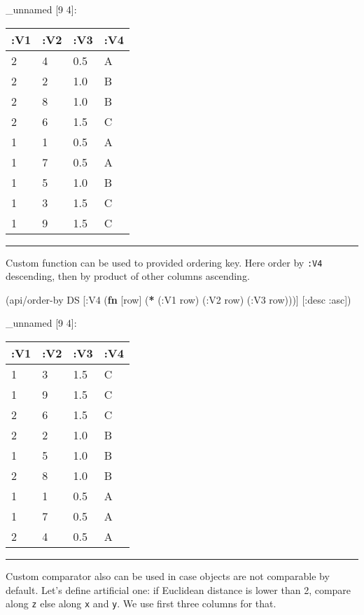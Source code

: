 \documentclass[]{article}
\newenvironment{Shaded}{\begin{snugshade}}{\end{snugshade}}
\newcommand{\AttributeTok}[1]{\textcolor[rgb]{0.77,0.63,0.00}{#1}}
\newcommand{\KeywordTok}[1]{\textcolor[rgb]{0.13,0.29,0.53}{\textbf{#1}}}
\newcommand{\NormalTok}[1]{#1}
\begin{document}
\_unnamed {[}9 4{]}:

\begin{longtable}[]{@{}llll@{}}
\toprule
:V1 & :V2 & :V3 & :V4\tabularnewline
\midrule
\endhead
2 & 4 & 0.5 & A\tabularnewline
2 & 2 & 1.0 & B\tabularnewline
2 & 8 & 1.0 & B\tabularnewline
2 & 6 & 1.5 & C\tabularnewline
1 & 1 & 0.5 & A\tabularnewline
1 & 7 & 0.5 & A\tabularnewline
1 & 5 & 1.0 & B\tabularnewline
1 & 3 & 1.5 & C\tabularnewline
1 & 9 & 1.5 & C\tabularnewline
\bottomrule
\end{longtable}

\begin{center}\rule{0.5\linewidth}{0.5pt}\end{center}

Custom function can be used to provided ordering key. Here order by
\texttt{:V4} descending, then by product of other columns ascending.

\begin{Shaded}
\begin{Highlighting}[]
\NormalTok{(api/order-by DS [}\AttributeTok{:V4}\NormalTok{ (}\KeywordTok{fn}\NormalTok{ [row] (}\KeywordTok{*}\NormalTok{ (}\AttributeTok{:V1}\NormalTok{ row)}
\NormalTok{                                  (}\AttributeTok{:V2}\NormalTok{ row)}
\NormalTok{                                  (}\AttributeTok{:V3}\NormalTok{ row)))] [}\AttributeTok{:desc} \AttributeTok{:asc}\NormalTok{])}
\end{Highlighting}
\end{Shaded}

\_unnamed {[}9 4{]}:

\begin{longtable}[]{@{}llll@{}}
\toprule
:V1 & :V2 & :V3 & :V4\tabularnewline
\midrule
\endhead
1 & 3 & 1.5 & C\tabularnewline
1 & 9 & 1.5 & C\tabularnewline
2 & 6 & 1.5 & C\tabularnewline
2 & 2 & 1.0 & B\tabularnewline
1 & 5 & 1.0 & B\tabularnewline
2 & 8 & 1.0 & B\tabularnewline
1 & 1 & 0.5 & A\tabularnewline
1 & 7 & 0.5 & A\tabularnewline
2 & 4 & 0.5 & A\tabularnewline
\bottomrule
\end{longtable}

\begin{center}\rule{0.5\linewidth}{0.5pt}\end{center}

Custom comparator also can be used in case objects are not comparable by
default. Let's define artificial one: if Euclidean distance is lower
than 2, compare along \texttt{z} else along \texttt{x} and \texttt{y}.
We use first three columns for that.
\end{document}
